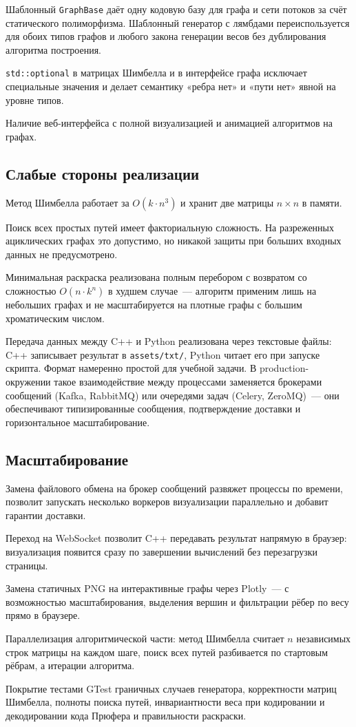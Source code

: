 Шаблонный \texttt{GraphBase} даёт одну кодовую базу для графа
и сети потоков за счёт статического полиморфизма. Шаблонный
генератор с лямбдами переиспользуется для обоих типов графов
и любого закона генерации весов без дублирования алгоритма построения.

\texttt{std::optional} в матрицах Шимбелла и в интерфейсе графа
исключает специальные значения и делает семантику «ребра нет» и
«пути нет» явной на уровне типов.

Наличие веб-интерфейса с полной визуализацией и анимацией алгоритмов
на графах.

\subsection*{Слабые стороны реализации}

Метод Шимбелла работает за $O(k \cdot n^3)$ и хранит две матрицы
$n \times n$ в памяти.

Поиск всех простых путей имеет факториальную сложность. На разреженных
ациклических графах это допустимо, но никакой защиты при больших
входных данных не предусмотрено.

Минимальная раскраска реализована полным перебором с возвратом
со сложностью $O(n \cdot k^n)$ в худшем случае~--- алгоритм
применим лишь на небольших графах и не масштабируется на плотные
графы с большим хроматическим числом.

Передача данных между C++ и Python реализована через текстовые файлы:
C++ записывает результат в \texttt{assets/txt/}, Python читает его
при запуске скрипта. Формат намеренно простой для учебной задачи.
В production-окружении такое взаимодействие между процессами
заменяется брокерами сообщений (Kafka, RabbitMQ) или очередями задач
(Celery, ZeroMQ)~--- они обеспечивают типизированные сообщения,
подтверждение доставки и горизонтальное масштабирование.

\subsection*{Масштабирование}

Замена файлового обмена на брокер сообщений развяжет процессы по
времени, позволит запускать несколько воркеров визуализации параллельно
и добавит гарантии доставки.

Переход на WebSocket позволит C++ передавать результат напрямую
в браузер: визуализация появится сразу по завершении вычислений
без перезагрузки страницы.

Замена статичных PNG на интерактивные графы через Plotly~--- с
возможностью масштабирования, выделения вершин и фильтрации рёбер
по весу прямо в браузере.

Параллелизация алгоритмической части: метод Шимбелла считает $n$
независимых строк матрицы на каждом шаге, поиск всех путей разбивается по стартовым рёбрам, а итерации алгоритма.

Покрытие тестами GTest граничных случаев генератора, корректности
матриц Шимбелла, полноты поиска путей, инвариантности веса при
кодировании и декодировании кода Прюфера и правильности раскраски.
